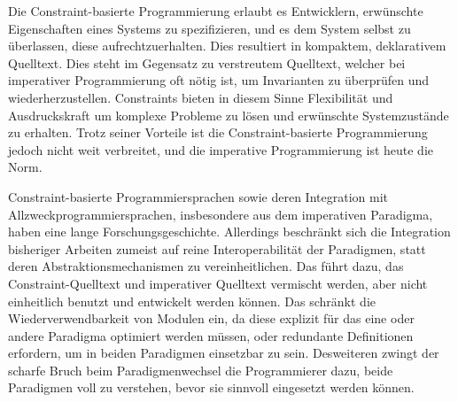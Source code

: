 Die Constraint-basierte Programmierung erlaubt es Entwicklern, erwünschte
Eigenschaften eines Systems zu spezifizieren, und es dem System selbst zu
überlassen, diese aufrechtzuerhalten. Dies resultiert in kompaktem, deklarativem
Quelltext. Dies steht im Gegensatz zu verstreutem Quelltext, welcher bei
imperativer Programmierung oft nötig ist, um Invarianten zu überprüfen und
wiederherzustellen. Constraints bieten in diesem Sinne Flexibilität und
Ausdruckskraft um komplexe Probleme zu lösen und erwünschte Systemzustände zu
erhalten. Trotz seiner Vorteile ist die Constraint-basierte Programmierung
jedoch nicht weit verbreitet, und die imperative Programmierung ist heute die
Norm.

Constraint-basierte Programmiersprachen sowie deren Integration mit
Allzweckprogrammiersprachen, insbesondere aus dem imperativen Paradigma, haben
eine lange Forschungsgeschichte. Allerdings beschränkt sich die Integration
bisheriger Arbeiten zumeist auf reine Interoperabilität der Paradigmen, statt
deren Abstraktionsmechanismen zu vereinheitlichen. Das führt dazu, das
Constraint-Quelltext und imperativer Quelltext vermischt werden, aber nicht
einheitlich benutzt und entwickelt werden können. Das schränkt die
Wiederverwendbarkeit von Modulen ein, da diese explizit für das eine oder andere
Paradigma optimiert werden müssen, oder redundante Definitionen erfordern, um in
beiden Paradigmen einsetzbar zu sein. Desweiteren zwingt der scharfe Bruch beim
Paradigmenwechsel die Programmierer dazu, beide Paradigmen voll zu verstehen,
bevor sie sinnvoll eingesetzt werden können.

